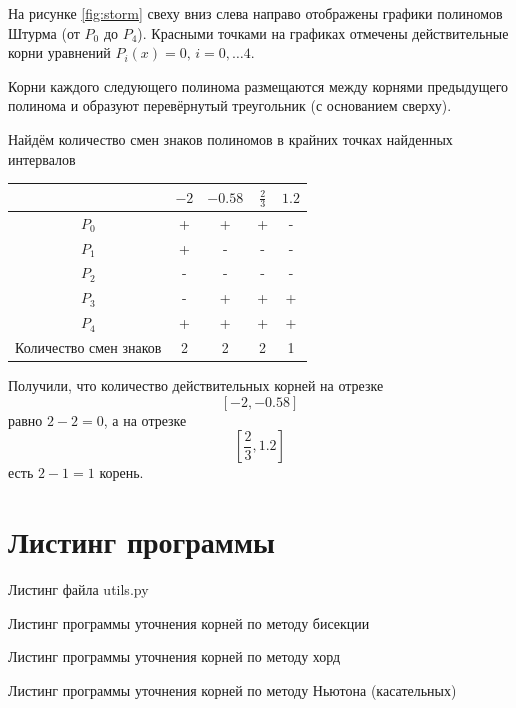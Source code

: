 На рисунке \ref{fig:storm} свеху вниз слева направо отображены графики полиномов Штурма (от $P_0$ до $P_4$).
Красными точками на графиках отмечены действительные корни уравнений $P_i \left( x \right) = 0, \, i = 0, \dotsc 4$.

Корни каждого следующего полинома размещаются между корнями предыдущего полинома и образуют перевёрнутый треугольник (с основанием сверху).

Найдём количество смен знаков полиномов в крайних точках найденных интервалов

\begin{center}
  \begin{tabular}{ | c | c | c | c | c |}
    \hline
    & $-2$ & $-0.58$ & $ \frac{2}{3}$ & $1.2$ \\ \hline
    $P_0$ & + & + & + & - \\ \hline
    $P_1$ & + & - & - & - \\ \hline
    $P_2$ & - & - & - & - \\ \hline
    $P_3$ & - & + & + & + \\ \hline
    $P_4$ & + & + & + & + \\ \hline
    Количество смен знаков & 2 & 2 & 2 & 1 \\
    \hline
  \end{tabular}
\end{center}

Получили, что количество действительных корней на отрезке
$$ \left[ -2, -0.58 \right] $$
равно $2 - 2 = 0$, а на отрезке
$$ \left[ \frac{2}{3}, 1.2 \right] $$
есть $2 - 1 = 1$ корень.

\chapter{Листинг программы}

Листинг файла utils.py
\lstset{inputencoding=utf8, extendedchars=\true}


Листинг программы уточнения корней по методу бисекции
\lstset{inputencoding=utf8, extendedchars=\true}


Листинг программы уточнения корней по методу хорд
\lstset{inputencoding=utf8, extendedchars=\true}


Листинг программы уточнения корней по методу Ньютона (касательных)
\lstset{inputencoding=utf8, extendedchars=\true}


